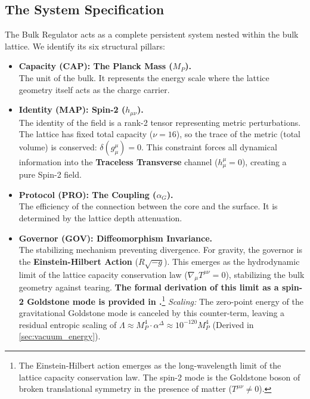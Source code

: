 \subsection{The System Specification}
The Bulk Regulator acts as a complete persistent system nested within the bulk lattice. We identify its six structural pillars:

\begin{itemize}
    \item \textbf{Capacity (CAP): The Planck Mass ($M_P$).} \\
    The unit of the bulk. It represents the energy scale where the lattice geometry itself acts as the charge carrier.
    
    \item \textbf{Identity (MAP): Spin-2 ($h_{\mu\nu}$).} \\
    The identity of the field is a rank-2 tensor representing metric perturbations. The lattice has fixed total capacity ($\nu=16$), so the trace of the metric (total volume) is conserved: $\delta(g^\mu_\mu) = 0$. This constraint forces all dynamical information into the \textbf{Traceless Transverse} channel ($h^\mu_\mu=0$), creating a pure Spin-2 field.
    
    \item \textbf{Protocol (PRO): The Coupling ($\alpha_G$).} \\
    The efficiency of the connection between the core and the surface. It is determined by the lattice depth attenuation.

    \item \textbf{Governor (GOV): Diffeomorphism Invariance.} \\
    The stabilizing mechanism preventing divergence. For gravity, the governor is the \textbf{Einstein-Hilbert Action} ($R\sqrt{-g}$). This emerges as the hydrodynamic limit of the lattice capacity conservation law ($\nabla_\mu T^{\mu\nu}=0$), stabilizing the bulk geometry against tearing. \textbf{The formal derivation of this limit as a spin-2 Goldstone mode is provided in \cite{meyer_ieaction_2026}.}\footnote{The Einstein-Hilbert action emerges as the long-wavelength limit of the lattice capacity conservation law. The spin-2 mode is the Goldstone boson of broken translational symmetry in the presence of matter ($T^{\mu\nu} \neq 0$).}
    \textit{Scaling:} The zero-point energy of the gravitational Goldstone mode is canceled by this counter-term, leaving a residual entropic scaling of $\Lambda \approx M_P^4 \cdot \alpha^{\Delta} \approx 10^{-120} M_P^4$ (Derived in \cref{sec:vacuum_energy}).


\end{itemize}
